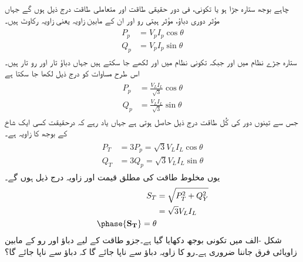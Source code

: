 چاہے بوجھ ستارہ جڑا ہو یا تکونی، فی دور حقیقی طاقت اور  متعاملی طاقت درج ذیل ہوں گے جہاں  مؤثر دوری دباؤ،  مؤثر ہیتی رو اور  ان کے مابین زاویہ یعنی زاویہ رکاوٹ  ہیں۔
\begin{gather}
\begin{aligned}\label{مساوات_تین_طاقت_حقیقی-متعاملی_الف}
P_p&=V_p I_p \cos \theta\\
Q_p&=V_p I_p \sin \theta
\end{aligned}
\end{gather} 
ستارہ جڑے نظام میں  اور  جبکہ تکونی نظام میں  اور  لکھے جا سکتے ہیں جہاں  دباؤ تار اور  رو تار ہیں۔ اس طرح  مساوات  کو درج ذیل لکھا جا سکتا ہے
\begin{gather}
\begin{aligned}\label{مساوات_تین_طاقت_حقیقی-متعاملی_ب}
P_p&=\frac{V_L I_L}{\sqrt{3}} \cos \theta\\
Q_p&=\frac{V_L I_L}{\sqrt{3}} \sin \theta
\end{aligned}
\end{gather}
جس سے تینوں دور کی کُل طاقت درج ذیل حاصل ہوتی ہے جہاں یاد رہے کہ  درحقیقت کسی ایک شاخ کے  بوجھ کا زاویہ  ہے۔
\begin{gather}
\begin{aligned}\label{مساوات_تین_طاقت_حقیقی-متعاملی_پ}
P_T&=3P_p=\sqrt{3}V_L I_L \cos \theta\\
Q_T&=3Q_p=\sqrt{3}V_L I_L \sin \theta
\end{aligned}
\end{gather}
یوں مخلوط طاقت کی مطلق قیمت اور زاویہ  درج ذیل ہوں گے۔
\begin{gather}
\begin{aligned}
S_T&=\sqrt{P^2_T+Q^2_Y}\\
&=\sqrt{3}V_L I_L\\
\phase{\bf{S}_T}=\theta
\end{aligned}
\end{gather}
شکل -الف میں تکونی بوجھ دکھایا گیا ہے۔جزو طاقت کے لیے دباؤ اور رو کے مابین زاویائی فرق جاننا ضروری ہے۔رو  کا زاویہ  دباؤ  سے ناپا جائے گا کہ دباؤ  سے ناپا جائے گا؟
